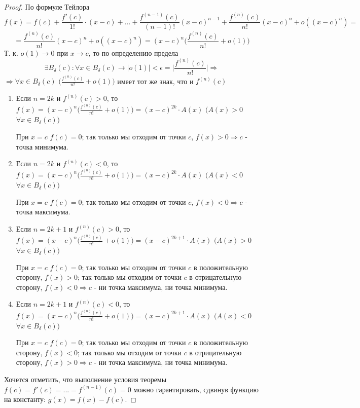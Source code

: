 	\begin{proof}
		По формуле Тейлора
		\[ f(x) = f(c) + \frac{f'(c)}{1!} \cdot (x - c) + ... + \frac{f^{(n - 1)}(c)}{(n - 1)!}(x - c)^{n - 1} + \frac{f^{(n)}(c)}{n!}(x - c)^n + o((x - c)^n) = \]
		\[ = \frac{f^{(n)}(c)}{n!}(x - c)^n + o((x - c)^n) = (x - c)^n \bigg(\frac{f^{(n)}(c)}{n!} + o(1)\bigg) \]
		Т. к. $o(1) \to 0$ при $x \to c$, то по определению предела
		\[ \exists B_{\delta}(c): \forall x \in B_{\delta}(c) \rightarrow |o(1)| < \epsilon = \bigg|\frac{f^{(n)}{(c)}}{n!}\bigg| \Rightarrow \]
		$\Rightarrow \forall x \in B_{\delta}(c)$ $\big(\frac{f^{(n)}(c)}{n!} + o(1)\big)$ имеет тот же знак, что и $f^{(n)}(c)$
		\begin{enumerate}
			\item Если $n = 2k$ и $f^{(n)}(c) > 0$, то $f(x) = (x - c)^n \big(\frac{f^{(n)}(c)}{n!} + o(1)\big) = (x - c)^{2k} \cdot A(x)$ $(A(x) > 0$ $\forall x \in B_{\delta}(c))$
			
			При $x = c$ $f(c) = 0$; так только мы отходим от точки $c$, $f(x) > 0 \Rightarrow c$ - точка минимума.
			\item Если $n = 2k$ и $f^{(n)}(c) < 0$, то $f(x) = (x - c)^n \big(\frac{f^{(n)}(c)}{n!} + o(1)\big) = (x - c)^{2k} \cdot A(x)$ $(A(x) < 0$ $\forall x \in B_{\delta}(c))$
			
			При $x = c$ $f(c) = 0$; так только мы отходим от точки $c$, $f(x) < 0 \Rightarrow c$ - точка максимума.
			\item Если $n = 2k + 1$ и $f^{(n)}(c) > 0$, то $f(x) = (x - c)^n \big(\frac{f^{(n)}(c)}{n!} + o(1)\big) = (x - c)^{2k + 1} \cdot A(x)$ $(A(x) > 0$ $\forall x \in B_{\delta}(c))$
			
			При $x = c$ $f(c) = 0$; так только мы отходим от точки $c$ в положительную сторону, $f(x) > 0$; так только мы отходим от точки $c$ в отрицательную сторону, $f(x) < 0 \Rightarrow c$ - ни точка максимума, ни точка минимума.
			\item Если $n = 2k + 1$ и $f^{(n)}(c) < 0$, то $f(x) = (x - c)^n \big(\frac{f^{(n)}(c)}{n!} + o(1)\big) = (x - c)^{2k + 1} \cdot A(x)$ $(A(x) < 0$ $\forall x \in B_{\delta}(c))$
			
			При $x = c$ $f(c) = 0$; так только мы отходим от точки $c$ в положительную сторону, $f(x) < 0$; так только мы отходим от точки $c$ в отрицательную сторону, $f(x) > 0 \Rightarrow c$ - ни точка максимума, ни точка минимума.
		\end{enumerate}
		
		Хочется отметить, что выполнение условия теоремы $f(c) = f'(c) = ... = f^{(n - 1)}(c) = 0$ можно гарантировать, сдвинув функцию на константу: $g(x) = f(x) - f(c)$.
	\end{proof}
	
